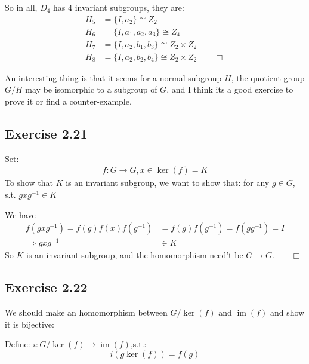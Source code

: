 \documentclass[]{ctexart}
\begin{document}
    So in all, $ D_4 $ has 4 invariant subgroups, they are:
    \begin{equation*}
      \begin{aligned}
      H_5&=\{I,a_2\}\cong Z_2\\
      H_6&=\{I,a_1,a_2,a_3\}\cong Z_4\\
      H_7&=\{I,a_2,b_1,b_3\}\cong Z_2\times Z_2\\
      H_8&=\{I,a_2,b_2,b_4\}\cong Z_2\times Z_2\qquad \Box
      \end{aligned}
    \end{equation*}
    
    An interesting thing is that it seems for a normal subgroup $ H $, the quotient group $ G/H $ may be isomorphic to a subgroup of $ G $, and I think its a good exercise to prove it or find a counter-example.
    
    
    \subsection{Exercise 2.21}
		Set:
		\begin{equation*}
		\begin{aligned}
		f:G\rightarrow G, x\in \operatorname{ker}(f)=K
		\end{aligned}
		\end{equation*}
		To show that $K$ is an invariant subgroup, we want to show that: for any $g\in G$, s.t. $gxg^{-1}\in K$
		
		We have
		\begin{equation*}
		\begin{aligned}
		f(gxg^{-1})=f(g)f(x)f(g^{-1})&=f(g)f(g^{-1})=f(gg^{-1})=I\\
		\Rightarrow gxg^{-1}&\in K
		\end{aligned}
		\end{equation*}
		So $K$ is an invariant subgroup, and the homomorphism need't be $G\rightarrow G.\qquad \Box$
		
		\subsection{Exercise 2.22}
		We should make an homomorphism between $ G/\operatorname{ker}(f) $ and $ \operatorname{im}(f) $ and show it is bijective:
		
		Define: $ i:G/\operatorname{ker}(f)\rightarrow \operatorname{im}(f) $,s.t.:
		\begin{equation*}
		i(g\operatorname{ker}(f))=f(g)
		\end{equation*}
		
\end{document}
